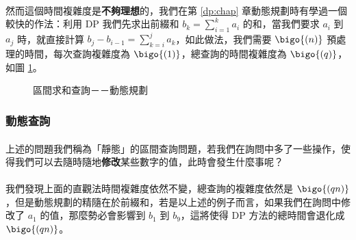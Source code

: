 \documentclass[12pt,a4paper,oneside]{report}
\begin{document}
\begin{CJK}{UTF8}{bkai}
\paragraph{}然而這個時間複雜度是\textbf{不夠理想}的，我們在第 \ref{dp:chap} 章動態規劃時有學過一個較快的作法：利用 DP 我們先求出前綴和 $b_k=\displaystyle\sum_{i=1}^{k}{a_i}$ 的和，當我們要求 $a_i$ 到 $a_j$ 時，就直接計算 $b_j-b_{i-1}=\displaystyle\sum_{k=i}^{j}{a_k}$，如此做法，我們需要 $\bigo{(n)}$ 預處理的時間，每次查詢複雜度為 $\bigo{(1)}$，總查詢的時間複雜度為 $\bigo{(q)}$，如圖 \ref{tree:fig:rsq:dp}。

\begin{figure}[h]
\centering
{}
\caption{區間求和查詢－－動態規劃}
\label{tree:fig:rsq:dp}
\end{figure}

\subsubsection{動態查詢}

\paragraph{}上述的問題我們稱為「靜態」的區間查詢問題，若我們在詢問中多了一些操作，使得我們可以去隨時隨地\textbf{修改}某些數字的值，此時會發生什麼事呢？

\paragraph{}我們發現上面的直觀法時間複雜度依然不變，總查詢的複雜度依然是 $\bigo{(qn)}$，但是動態規劃的精隨在於前綴和，若是以上述的例子而言，如果我們在詢問中修改了 $a_1$ 的值，那麼勢必會影響到 $b_1$ 到 $b_9$，這將使得 DP 方法的總時間會退化成 $\bigo{(qn)}$。


\end{CJK}
\end{document}
